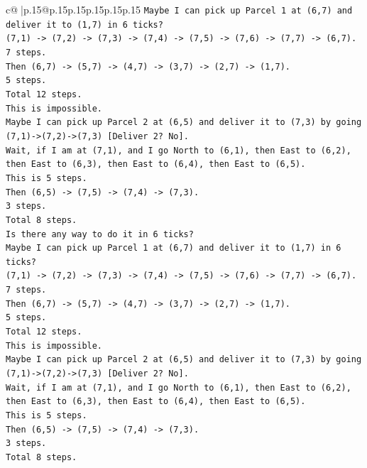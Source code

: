 \documentclass{article}
\begin{document}
{\begin{supertabular}{c@{$\;$}|p{.15\linewidth}@{}p{.15\linewidth}p{.15\linewidth}p{.15\linewidth}p{.15\linewidth}p{.15\linewidth}}
{{{\texttt{Maybe I can pick up Parcel 1 at (6,7) and deliver it to (1,7) in 6 ticks?} \\
\texttt{(7,1) {-}> (7,2) {-}> (7,3) {-}> (7,4) {-}> (7,5) {-}> (7,6) {-}> (7,7) {-}> (6,7).} \\
\texttt{7 steps.} \\
\texttt{Then (6,7) {-}> (5,7) {-}> (4,7) {-}> (3,7) {-}> (2,7) {-}> (1,7).} \\
\texttt{5 steps.} \\
\texttt{Total 12 steps.} \\
\texttt{This is impossible.} \\
\texttt{Maybe I can pick up Parcel 2 at (6,5) and deliver it to (7,3) by going (7,1){-}>(7,2){-}>(7,3) {[}Deliver 2? No{]}.} \\
\texttt{Wait, if I am at (7,1), and I go North to (6,1), then East to (6,2), then East to (6,3), then East to (6,4), then East to (6,5).} \\
\texttt{This is 5 steps.} \\
\texttt{Then (6,5) {-}> (7,5) {-}> (7,4) {-}> (7,3).} \\
\texttt{3 steps.} \\
\texttt{Total 8 steps.} \\
\texttt{Is there any way to do it in 6 ticks?} \\
\texttt{Maybe I can pick up Parcel 1 at (6,7) and deliver it to (1,7) in 6 ticks?} \\
\texttt{(7,1) {-}> (7,2) {-}> (7,3) {-}> (7,4) {-}> (7,5) {-}> (7,6) {-}> (7,7) {-}> (6,7).} \\
\texttt{7 steps.} \\
\texttt{Then (6,7) {-}> (5,7) {-}> (4,7) {-}> (3,7) {-}> (2,7) {-}> (1,7).} \\
\texttt{5 steps.} \\
\texttt{Total 12 steps.} \\
\texttt{This is impossible.} \\
\texttt{Maybe I can pick up Parcel 2 at (6,5) and deliver it to (7,3) by going (7,1){-}>(7,2){-}>(7,3) {[}Deliver 2? No{]}.} \\
\texttt{Wait, if I am at (7,1), and I go North to (6,1), then East to (6,2), then East to (6,3), then East to (6,4), then East to (6,5).} \\
\texttt{This is 5 steps.} \\
\texttt{Then (6,5) {-}> (7,5) {-}> (7,4) {-}> (7,3).} \\
\texttt{3 steps.} \\
\texttt{Total 8 steps.} \\
}}}
\end{supertabular}}
\end{document}

